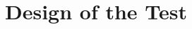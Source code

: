 \documentclass[../UsabilityReport.tex]{subfiles}
\begin{document}
\chapter{Design of the Test}
\thispagestyle{fancy}
		
		
		
		
		
		\newpage
\end{document}
